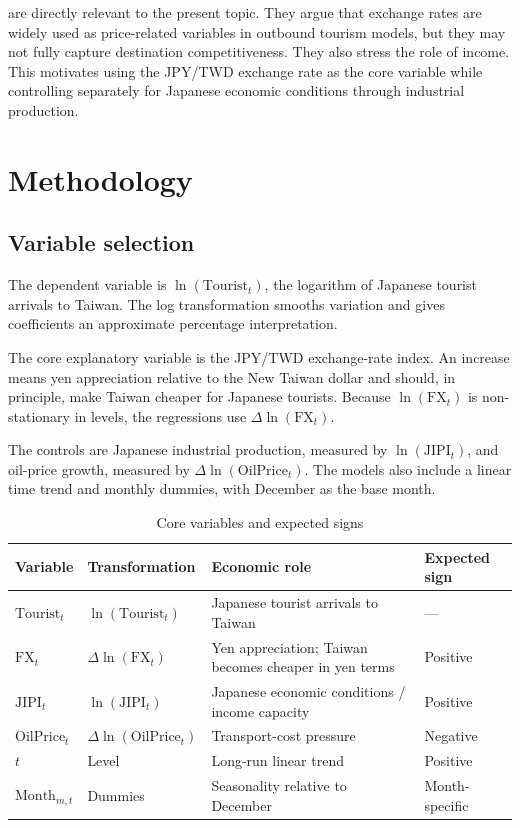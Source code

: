 \documentclass[12pt]{article}
\begin{document}
\citet{seetaram2016} are directly relevant to the present topic. They argue that exchange rates are widely used as price-related variables in outbound tourism models, but they may not fully capture destination competitiveness. They also stress the role of income. This motivates using the JPY/TWD exchange rate as the core variable while controlling separately for Japanese economic conditions through industrial production.

\section{Methodology}

\subsection{Variable selection}

The dependent variable is $\ln(\mathrm{Tourist}_t)$, the logarithm of Japanese tourist arrivals to Taiwan. The log transformation smooths variation and gives coefficients an approximate percentage interpretation.

The core explanatory variable is the JPY/TWD exchange-rate index. An increase means yen appreciation relative to the New Taiwan dollar and should, in principle, make Taiwan cheaper for Japanese tourists. Because $\ln(\mathrm{FX}_t)$ is non-stationary in levels, the regressions use $\Delta \ln(\mathrm{FX}_t)$.

The controls are Japanese industrial production, measured by $\ln(\mathrm{JIPI}_t)$, and oil-price growth, measured by $\Delta \ln(\mathrm{OilPrice}_t)$. The models also include a linear time trend and monthly dummies, with December as the base month.

\begin{table}[H]
\centering
\caption{Core variables and expected signs}
\begin{tabularx}{\textwidth}{>{\raggedright\arraybackslash}p{} >{\raggedright\arraybackslash}p{} >{\raggedright\arraybackslash}X >{\centering\arraybackslash}p{}}
\toprule
Variable & Transformation & Economic role & Expected sign \\
\midrule
$\mathrm{Tourist}_t$ & $\ln(\mathrm{Tourist}_t)$ & Japanese tourist arrivals to Taiwan & --- \\
$\mathrm{FX}_t$ & $\Delta \ln(\mathrm{FX}_t)$ & Yen appreciation; Taiwan becomes cheaper in yen terms & Positive \\
$\mathrm{JIPI}_t$ & $\ln(\mathrm{JIPI}_t)$ & Japanese economic conditions / income capacity & Positive \\
$\mathrm{OilPrice}_t$ & $\Delta \ln(\mathrm{OilPrice}_t)$ & Transport-cost pressure & Negative \\
$t$ & Level & Long-run linear trend & Positive \\
$\mathrm{Month}_{m,t}$ & Dummies & Seasonality relative to December & Month-specific \\
\bottomrule
\end{tabularx}
\end{table}
\end{document}
